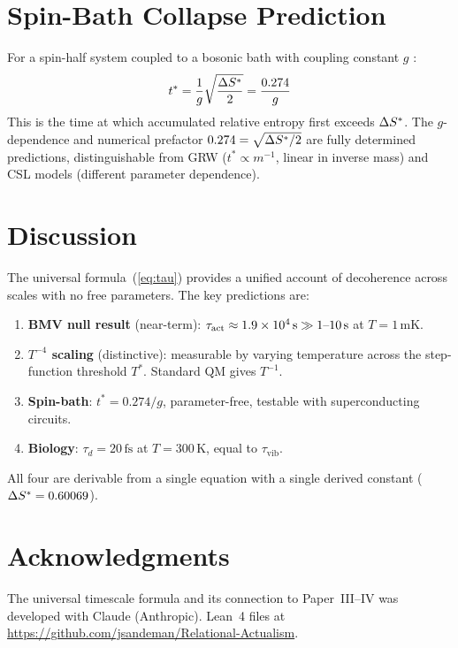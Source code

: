 \documentclass[12pt,a4paper]{article}
\begin{document}
\section{Spin-Bath Collapse Prediction}

For a spin-half system coupled to a bosonic bath with coupling constant $g$ \statusCV:
\begin{equation}
  t^* = \frac{1}{g}\sqrt{\frac{\Delta S^*}{2}} = \frac{0.274}{g}
  \label{eq:spinbath}
\end{equation}
This is the time at which accumulated relative entropy first exceeds $\Delta S^*$.  The $g$-dependence and numerical prefactor $0.274 = \sqrt{\Delta S^*/2}$ are fully determined predictions, distinguishable from GRW ($t^* \propto m^{-1}$, linear in inverse mass) and CSL models (different parameter dependence).

\section{Discussion}

The universal formula~(\ref{eq:tau}) provides a unified account of decoherence across scales with no free parameters.  The key predictions are:
\begin{enumerate}
  \item \textbf{BMV null result} (near-term): $\tau_{\mathrm{act}} \approx 1.9\times10^4\,\mathrm{s} \gg 1\text{--}10\,\mathrm{s}$ at $T=1\,\mathrm{mK}$.
  \item \textbf{$T^{-4}$ scaling} (distinctive): measurable by varying temperature across the step-function threshold $T^*$.  Standard QM gives $T^{-1}$.
  \item \textbf{Spin-bath}: $t^* = 0.274/g$, parameter-free, testable with superconducting circuits.
  \item \textbf{Biology}: $\tau_d = 20\,\mathrm{fs}$ at $T=300\,\mathrm{K}$, equal to $\tau_{\mathrm{vib}}$.
\end{enumerate}
All four are derivable from a single equation with a single derived constant ($\Delta S^* = 0.60069$).

\section*{Acknowledgments}
The universal timescale formula and its connection to Paper~III--IV was developed with Claude (Anthropic).  Lean~4 files at \url{https://github.com/jsandeman/Relational-Actualism}.
\end{document}
